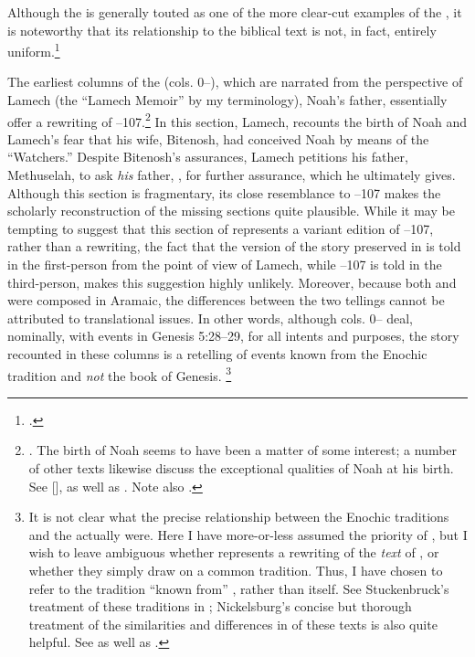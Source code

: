 Although the \ga is generally touted as one of the more clear-cut examples of the \rwb, it is noteworthy that its relationship to the biblical text is not, in fact, entirely uniform.\footnote{\cite[333]{bernstein_berthelot-etal2010}.}



The earliest columns of the \ga (cols. 0--), which are narrated from the perspective of Lamech (the ``Lamech Memoir'' by my terminology), Noah's father, essentially offer a rewriting of --107.\footnote{\cite[174]{nickelsburg2005}. The birth of Noah seems to have been a matter of some interest; a number of other texts likewise discuss the exceptional qualities of Noah at his birth. See [],  as well as \cite{vanderkam_kapera1992}. Note also \cite{stuckenbruck_berthelot-etal2010}.} In this section, Lamech, recounts the birth of Noah and Lamech's fear that his wife, Bitenosh, had conceived Noah by means of the  ``Watchers.'' Despite Bitenosh's assurances, Lamech petitions his father, Methuselah, to ask \emph{his} father, \enoch, for further assurance, which he ultimately gives. Although this section is fragmentary, its close resemblance to --107 makes the scholarly reconstruction of the missing sections quite plausible. While it may be tempting to suggest that this section of \ga represents a variant edition of --107, rather than a rewriting, the fact that the version of the story preserved in \ga is told in the first-person from the point of view of Lamech, while --107 is told in the third-person, makes this suggestion highly unlikely. Moreover, because both \firstenoch and \ga were composed in Aramaic, the differences between the two tellings cannot be attributed to translational issues. In other words, although cols. 0-- deal, nominally, with events in Genesis 5:28--29, for all intents and purposes, the story recounted in these columns is a retelling of events known from the Enochic tradition and \emph{not} the book of Genesis.%
%
\footnote{It is not clear what the precise relationship between the Enochic traditions and the \ga actually were. Here I have more-or-less assumed the priority of \firstenoch, but I wish to leave ambiguous whether \ga represents a rewriting of the \emph{text} of \firstenoch, or whether they simply draw on a common tradition. Thus, I have chosen to refer to the tradition ``known from'' \firstenoch, rather than \firstenoch itself. See Stuckenbruck's treatment of these traditions in \cite*{stuckenbruck_berthelot-etal2010}; Nickelsburg's concise but thorough treatment of the similarities and differences in of these texts is also quite helpful. See \cite[173--174]{nickelsburg2005} as well as \cite[122--123]{fitzmyer2004}.} 


